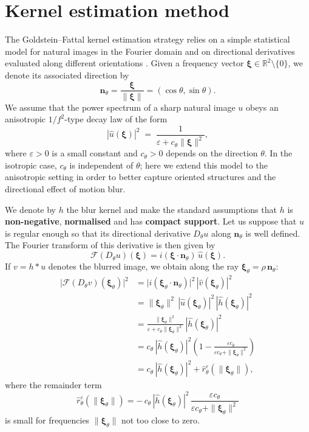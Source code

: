 \documentclass[a4paper,11pt]{article}
\begin{document}
\section{Kernel estimation method}

The Goldstein--Fattal kernel estimation strategy relies on a simple statistical model for natural images in the Fourier domain and on directional derivatives evaluated along different orientations \cite{gf}. Given a frequency vector $\bm{\xi}\in\mathbb{R}^2\setminus\{0\}$, we denote its associated direction by
\[
\mathbf{n}_\theta = \frac{\bm{\xi}}{\|\bm{\xi}\|} = (\cos\theta,\sin\theta).
\]
We assume that the power spectrum of a sharp natural image $u$ obeys an anisotropic $1/f^2$-type decay law of the form
\[
|\hat{u}(\bm{\xi})|^2 \;=\; \frac{1}{\varepsilon + c_\theta \|\bm{\xi}\|^{2}},
\]
where $\varepsilon>0$ is a small constant and $c_\theta>0$ depends on the direction $\theta$. In the isotropic case, $c_\theta$ is independent of $\theta$; here we extend this model to the anisotropic setting in order to better capture oriented structures and the directional effect of motion blur.

We denote by $h$ the blur kernel and make the standard assumptions that $h$ is \textbf{non-negative}, \textbf{normalised} and has \textbf{compact support}. Let us suppose that $u$ is regular enough so that its directional derivative $D_\theta u$ along $\mathbf{n}_\theta$ is well defined. The Fourier transform of this derivative is then given by
\[
\mathcal{F}(D_\theta u)(\bm{\xi}) = i(\bm{\xi}\cdot\mathbf{n}_\theta)\,\hat u(\bm{\xi}).
\]
If $v = h * u$ denotes the blurred image, we obtain along the ray $\bm{\xi}_\theta = \rho\,\mathbf{n}_\theta$:
\begin{align*}
\big|\mathcal{F}(D_\theta v)(\bm{\xi}_\theta)\big|^2
&= \big|i(\bm{\xi}_\theta\cdot\mathbf{n}_\theta)\big|^2\,|\hat v(\bm{\xi}_\theta)|^2 \\
&= \|\bm{\xi}_\theta\|^2\,|\hat u(\bm{\xi}_\theta)|^2\,|\hat h(\bm{\xi}_\theta)|^2 \\
&= \frac{\|\bm{\xi}_\theta\|^2}{\varepsilon + c_\theta \|\bm{\xi}_\theta\|^2}\,|\hat h(\bm{\xi}_\theta)|^2 \\
&= c_\theta\,|\hat h(\bm{\xi}_\theta)|^2\left(1 - \frac{\varepsilon c_\theta}{\varepsilon c_\theta + \|\bm{\xi}_\theta\|^2}\right) \\
&= c_\theta\,|\hat h(\bm{\xi}_\theta)|^2 + \hat r_\theta^\varepsilon(\|\bm{\xi}_\theta\|),
\end{align*}
where the remainder term
\[
\hat r_\theta^\varepsilon(\|\bm{\xi}_\theta\|)
= -\,c_\theta\,|\hat h(\bm{\xi}_\theta)|^2\,\frac{\varepsilon c_\theta}{\varepsilon c_\theta + \|\bm{\xi}_\theta\|^2}
\]
is small for frequencies $\|\bm{\xi}_\theta\|$ not too close to zero.
\end{document}
